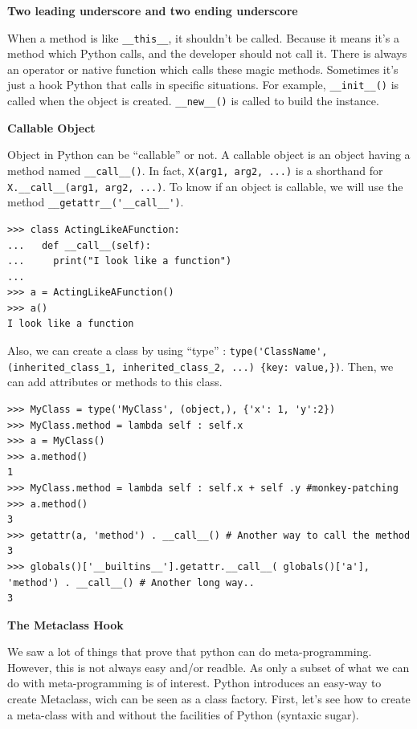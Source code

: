 \documentclass[a4paper,10pt]{article}
\begin{document}
\textbf{Two leading underscore and two ending underscore}

When a method is like \lstinline|__this__|, it shouldn't be called. Because it means it's a method which Python calls, and the developer should not call it. There is always an operator or native function which calls these magic methods. Sometimes it's just a hook Python that calls in specific situations. For example, \lstinline|__init__()| is called when the object is created. \lstinline|__new__()| is called to build the instance.

\textbf{Callable Object}

Object in Python can be “callable” or not. A callable object is an object having a method named \lstinline|__call__()|. In fact, \lstinline|X(arg1, arg2, ...)| is a shorthand for \mbox{\lstinline|X.__call__(arg1, arg2, ...)|.} To know if an object is callable, we will use the method \lstinline|__getattr__('__call__')|.

\begin{lstlisting}
>>> class ActingLikeAFunction:
...   def __call__(self):
...     print("I look like a function")
...
>>> a = ActingLikeAFunction()
>>> a()
I look like a function
\end{lstlisting}

Also, we can create a class by using ``type'' : \lstinline|type('ClassName', (inherited_class_1, inherited_class_2, ...) {key: value,})|. Then, we can add attributes or methods to this class.

\begin{lstlisting}
>>> MyClass = type('MyClass', (object,), {'x': 1, 'y':2})
>>> MyClass.method = lambda self : self.x
>>> a = MyClass()
>>> a.method()
1
>>> MyClass.method = lambda self : self.x + self .y #monkey-patching
>>> a.method()
3
>>> getattr(a, 'method') . __call__() # Another way to call the method
3
>>> globals()['__builtins__'].getattr.__call__( globals()['a'], 'method') . __call__() # Another long way..
3
\end{lstlisting}

\textbf{The Metaclass Hook}

We saw a lot of things that prove that python can do meta-programming. However, this is not always easy and/or readble. As only a subset of what we can do with meta-programming is of interest. Python introduces an easy-way to create Metaclass, wich can be seen as a class factory. First, let's see how to create a meta-class with and without the facilities of Python (syntaxic sugar).
\end{document}
